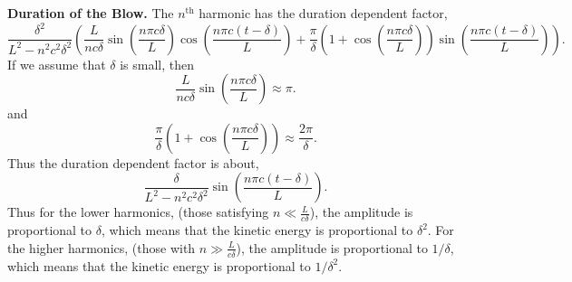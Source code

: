 {\begin{Solution}
  \textbf{Duration of the Blow.}
  The $n^{\mathrm{th}}$ harmonic has the duration dependent factor,
  \[
  \frac{\delta^2}{L^2 - n^2 c^2 \delta^2} \left( \frac{L}{n c \delta}
    \sin\left( \frac{n \pi c \delta}{L} \right)
    \cos\left( \frac{n \pi c (t - \delta)}{L} \right)
    + \frac{\pi}{\delta} \left( 
      1 + \cos\left( \frac{n \pi c \delta}{L} \right) \right)
    \sin\left( \frac{n \pi c (t - \delta)}{L} \right) \right).
  \]
  If we assume that $\delta$ is small, then
  \[
  \frac{L}{n c \delta} \sin\left( \frac{n \pi c \delta}{L} \right) \approx \pi.
  \]
  and
  \[
  \frac{\pi}{\delta} \left( 1 + \cos\left( \frac{n \pi c \delta}{L} \right)
  \right) \approx \frac{2 \pi}{\delta}.
  \]
  Thus the duration dependent factor is about,
  \[
  \frac{\delta}{L^2 - n^2 c^2 \delta^2} 
  \sin\left( \frac{n \pi c (t - \delta)}{L} \right).
  \]
  Thus for the lower harmonics, (those satisfying $n \ll \frac{L}{c \delta}$),
  the amplitude is proportional to $\delta$, which means that the kinetic 
  energy is proportional to $\delta^2$.  For the higher 
  harmonics, (those with $n \gg \frac{L}{c \delta}$), the amplitude is 
  proportional to $1/\delta$, which means that the kinetic energy is
  proportional to $1/\delta^2$.
\end{Solution}

















}
